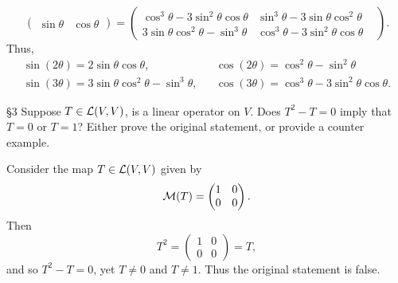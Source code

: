\documentclass{review-sheet}
\begin{document}
\begin{solution}
\begin{enumerate}[label=(\alph*)]
\[\begin{pmatrix}
        \sin{\theta}&\cos{\theta} \end{pmatrix}=\begin{pmatrix}
        \cos^3{\theta}-3\sin^2{\theta}\cos{\theta}&\sin^3{\theta}-3\sin{\theta}\cos^2{\theta}\\
      3\sin{\theta}\cos^2{\theta}-\sin^3{\theta}&
    \cos^3{\theta}-3\sin^2{\theta}\cos{\theta}&\end{pmatrix} 
      .\] 
      Thus,
       \begin{align*}
         \sin{(2\theta)}=2\sin{\theta}\cos{\theta},&&
         \cos{(2\theta)}=\cos^2{\theta}-\sin^2{\theta}\\
         \sin{(3\theta)}=3\sin{\theta}\cos^2{\theta}-\sin^3{\theta}, &&
         \cos{(3\theta)}=\cos^3{\theta}-3\sin^2{\theta}\cos{\theta}
      .\end{align*}
  \end{enumerate}
\end{solution}

\begin{problem}{\S 3}
  Suppose $T\in \mathcal{L}(V,V)$, is a linear operator on $V$. Does $T^2-T=0$ imply that $T=0$ or $T=1$?
  Either prove the original statement, or provide a counter example.
\end{problem}

\begin{solution}
  Consider the map $T\in \mathcal{L}(V,V)$ given by \[
    \mathcal{M}(T)=\begin{pmatrix} 1&0\\0&0 \end{pmatrix} 
  .\] Then \[
  T^2=\begin{pmatrix} 1&0\\0&0 \end{pmatrix} =T
  ,\] and so $T^2-T=0$, yet $T\neq 0$ and $T\neq 1$. Thus the original statement is false.
\end{solution}
\end{document}
